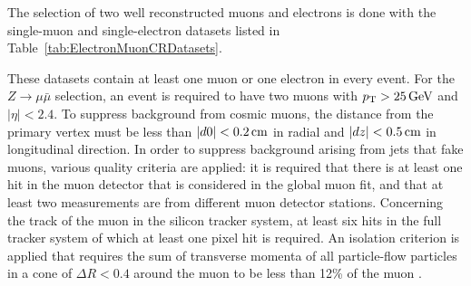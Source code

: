 The selection of two well reconstructed muons and electrons is done with the single-muon and single-electron datasets listed in Table~\ref{tab:ElectronMuonCRDatasets}.
\renewcommand{\arraystretch}{1.5}
\begin{table}[!t]
\centering
\caption{Datasets used for the determination of the fake rate.}
\label{tab:ElectronMuonCRDatasets}
\end{table}
These datasets contain at least one muon or one electron in every event.
For the $Z\rightarrow\mu\bar{\mu}$ selection, an event is required to have two muons with $p_{\text{T}}>25\,\text{Ge}\kern-0.06667em\text{V}$ and $|\eta|<2.4$.
To suppress background from cosmic muons, the distance from the primary vertex must be less than $|d0|<0.2\,\text{cm}$ in radial and $|dz|<0.5\,\text{cm}$ in longitudinal direction.
In order to suppress background arising from jets that fake muons, various quality criteria are applied: it is required that there is at least one hit in the muon detector that is considered in the global muon fit, 
and that at least two measurements are from different muon detector stations.
Concerning the track of the muon in the silicon tracker system, at least six hits in the full tracker system of which at least one pixel hit is required. %
An isolation criterion is applied that requires the sum of transverse momenta of all particle-flow particles in a cone of $\Delta R<0.4$ around the muon to be less than 12\% of the muon \pt.
